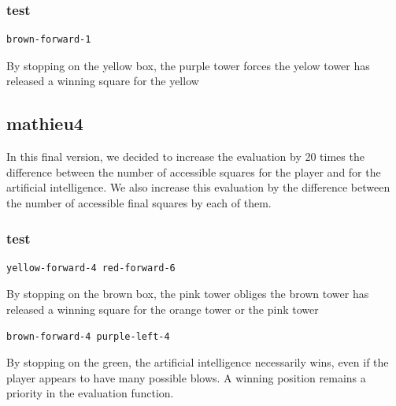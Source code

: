 \documentclass[a4paper, 11pt]{article}
\begin{document}
\subsubsection{test}
\begin{verbatim}
brown-forward-1
\end{verbatim}
By stopping on the yellow box, the purple tower forces the yelow tower has released a winning square for the yellow

\subsection{mathieu4}
In this final version, we decided to increase the evaluation by 20 times the difference between the number of accessible squares for the player and for the artificial intelligence. We also increase this evaluation by the difference between the number of accessible final squares by each of them.

\subsubsection{test}
\begin{verbatim}
yellow-forward-4 red-forward-6
\end{verbatim}
By stopping on the brown box, the pink tower obliges the brown tower has released a winning square for the orange tower or the pink tower
\begin{verbatim}
brown-forward-4 purple-left-4
\end{verbatim}
By stopping on the green, the artificial intelligence necessarily wins, even if the player appears to have many possible blows. A winning position remains a priority in the evaluation function.
\end{document}
